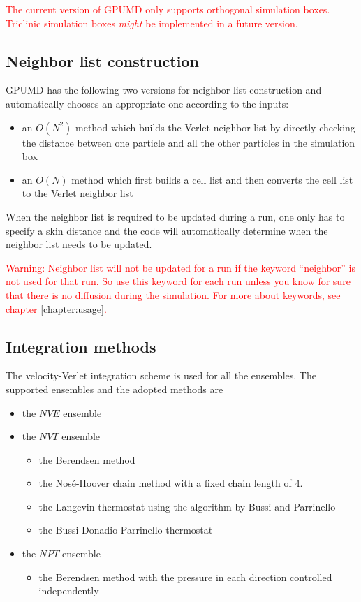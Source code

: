 \documentclass[12pt,a4paper]{report}
\begin{document}
\textcolor{red}{The current version of GPUMD only supports orthogonal simulation boxes. Triclinic simulation boxes \textit{might} be implemented in a future version.}




\subsection{Neighbor list construction}

GPUMD has the following two versions for neighbor list construction and automatically chooses an appropriate one according to the inputs:
  \begin{itemize}
  \item an $O(N^2)$ method which builds the Verlet neighbor list by directly checking the distance between one particle and all the other particles in the simulation box
  \item an $O(N)$ method which first builds a cell list and then converts the cell list to the Verlet neighbor list
  \end{itemize}
When the neighbor list is required to be updated during a run, one only has to specify a skin distance and the code will automatically determine when the neighbor list needs to be updated.

\textcolor{red}{Warning: Neighbor list will not be updated for a run if the keyword ``neighbor'' is not used for that run. So use this keyword for each run unless you know for sure that there is no diffusion during the simulation. For more about keywords, see chapter \ref{chapter:usage}.}


\subsection{Integration methods}

The velocity-Verlet \cite{swope1982jcp} integration scheme is used for all the ensembles.
The supported ensembles and the adopted methods are
  \begin{itemize}
  \item the $NVE$ ensemble
  \item the $NVT$ ensemble
    \begin{itemize}
    \item the Berendsen method  \cite{berendsen1984jcp}
    \item the Nos\'{e}-Hoover chain method \cite{nose1984jcp,hoover1985pra,martyna1992jcp,martyna1996mp,tuckerman2010}
        with a fixed chain length of 4.
    \item the Langevin thermostat using the algorithm by Bussi and Parrinello \cite{bussi2007pre}
    \item the Bussi-Donadio-Parrinello thermostat \cite{bussi2007jcp}
    \end{itemize}
  \item the $NPT$ ensemble
    \begin{itemize}
    \item the Berendsen method  \cite{berendsen1984jcp} with the pressure in each direction controlled independently
    \end{itemize}
  \end{itemize}
\end{document}
